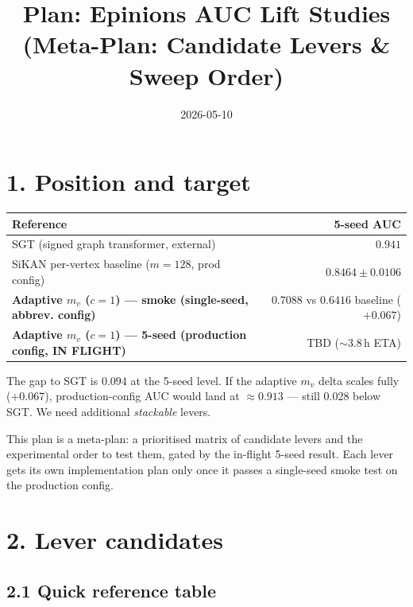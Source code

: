 \documentclass[a4paper,11pt]{article}
\title{Plan: Epinions AUC Lift Studies\\(Meta-Plan: Candidate Levers \& Sweep Order)}
\author{}
\date{2026-05-10}
\begin{document}
\maketitle

\section*{1. Position and target}

\begin{tabular}{lr}
\toprule
Reference & 5-seed AUC \\
\midrule
SGT (signed graph transformer, external) & $0.941$ \\
SiKAN per-vertex baseline ($m{=}128$, prod config) & $0.8464 \pm 0.0106$ \\
\midrule
\textbf{Adaptive $m_v$ ($c{=}1$) — smoke (single-seed, abbrev. config)} & $0.7088$ vs $0.6416$ baseline ($+0.067$) \\
\textbf{Adaptive $m_v$ ($c{=}1$) — 5-seed (production config, IN FLIGHT)} & TBD ($\sim 3.8$\,h ETA) \\
\bottomrule
\end{tabular}

\bigskip

The gap to SGT is $0.094$ at the 5-seed level.  If the adaptive $m_v$
delta scales fully ($+0.067$), production-config AUC would land at
$\approx 0.913$ — still $0.028$ below SGT.  We need additional
\emph{stackable} levers.

This plan is a meta-plan: a prioritised matrix of candidate levers
and the experimental order to test them, gated by the in-flight
5-seed result.  Each lever gets its own implementation plan only
once it passes a single-seed smoke test on the production config.

\section*{2. Lever candidates}

\subsection*{2.1 Quick reference table}
\end{document}
